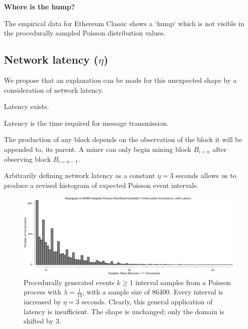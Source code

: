 \documentclass[11pt]{article}
\begin{document}

	\clearpage

	\textbf{Where is the hump?}

	The empirical data for Ethereum Classic shows a `hump` which is not visible in the
	procedurally sampled Poisson distribution values.

	\subsection{\normalsize{Network latency ($\eta$)}}

	We propose that an explanation can be made for this unexpected shape
	by a consideration of network latency.

	\vspace{5mm}
	\begin{proposition}
		Latency exists.
	\end{proposition}

	Latency is the time required for message transmission.

	The production of any block depends on the observation of the block it will be appended to, its parent.
	A miner can only begin mining block $B_{i=n}$ after observing block $B_{i=n-1}$.

	Arbitrarily defining network latency as a constant $\eta=3$ seconds allows us
	to produce a revised histogram of expected Poisson event intervals.

	\begin{figure}[tph]
		\centering
		\includegraphics[width=1.0\textwidth]{go-block-step/out/vis_poisson_samples_eventintervals_latencynaive_hist.png}
		\caption{
			Procedurally generated events $k \geq 1$ interval samples from a Poisson process
			with $\lambda = \frac{1}{14}$, with a sample size of 86400.
			Every interval is increased by $\eta=3$ seconds.
			Clearly, this general application of latency is insufficient.
			The shape is unchanged; only the domain is shifted by $3$.
		}
	\end{figure}
\end{document}
